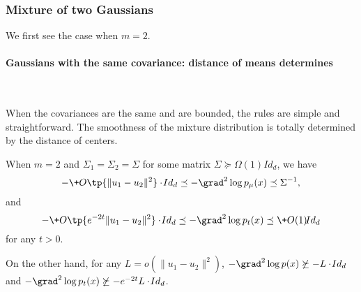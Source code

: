 \subsubsection{Mixture of two Gaussians}\label{subsubsec:2gaussian}
We first see the case when $m=2$. 

\paragraph{Gaussians with the same covariance: distance of means determines}~

When the covariances are the same and are bounded, the rules are simple and straightforward. The smoothness of the mixture distribution is totally determined by the distance of centers.

\begin{lemma}\label{lem:2-same}
    When $m=2$ and $\Sigma_1 = \Sigma_2 = \Sigma$ for some matrix $\Sigma\succeq \Omega(1)\!{Id}_d$, we have
    \[
        -\+O\tp{\|u_1-u_2\|^2}\cdot \!{Id}_d \preceq -\grad^2 \log p_{\mu}(x) \preceq \Sigma^{-1}, 
    \]
    and 
    \[
         -\+O\tp{e^{-2t}\|u_1-u_2\|^2}\cdot \!{Id}_d \preceq -\grad^2 \log p_t(x) \preceq \+O(1)\!{Id}_d
    \]
    for any $t>0$.
    
    On the other hand, for any $L=o(\|u_1-u_2\|^2)$, $-\grad^2 \log p(x) \not\succeq -L\cdot \!{Id}_d$ and $-\grad^2 \log p_t(x) \not\succeq -e^{-2t}L\cdot \!{Id}_d$.
\end{lemma}
